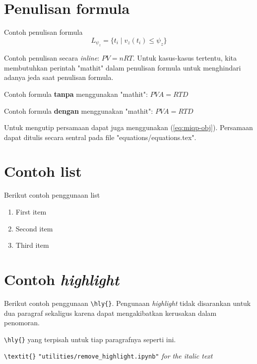 \section{Penulisan formula}
Contoh penulisan formula
\begin{equation}
L_{\psi_z} = \{ t_i \mid v_z(t_i) \le \psi_z \}
\end{equation}

Contoh penulisan secara \textit{inline}: $\mathit{PV = nRT}$. Untuk kasus-kasus tertentu, kita membutuhkan perintah "mathit" dalam penulisan formula untuk menghindari adanya jeda saat penulisan formula.

Contoh formula \textbf{tanpa} menggunakan "mathit": $PVA = RTD$

Contoh formula \textbf{dengan} menggunakan "mathit": $\mathit{PVA = RTD}$

Untuk mengutip persamaan dapat juga menggunakan (\ref{eq:miqp-obj}). Persamaan dapat ditulis secara sentral pada file "equations/equations.tex".


\section{Contoh list}
Berikut contoh penggunaan list
\begin{enumerate}
    \item First item
    \item Second item
    \item Third item
\end{enumerate}

\section{Contoh \textit{highlight}}
Berikut contoh penggunaan  \verb|\hly{}|. Pengunaan \textit{highlight} tidak disarankan untuk dua paragraf sekaligus karena dapat mengakibatkan kerusakan dalam penomoran.

 \verb|\hly{}| yang terpisah untuk tiap paragrafnya seperti ini.

 \verb|\textit{}|  \verb|"utilities/remove_highlight.ipynb"|  \textit{for the italic text} 
